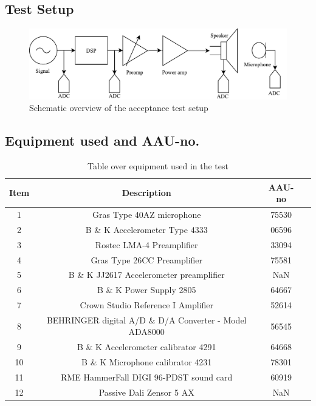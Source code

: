 \subsection*{Test Setup}

\begin{figure}[H]
	\centering
	\includegraphics[width=1\textwidth]{figures/TestAcceptance}
	\caption{Schematic overview of the acceptance test setup}
	\label{fig:Acceptancetest}
\end{figure}


\subsection*{Equipment used and AAU-no.}

\begin{table}[H]
\centering
{}
\begin{tabular}{S[table-format=1]ccc} \toprule
    {Item} & {Description} & {AAU-no} \\       &  Gras Type 40AZ microphone  & 75530   \\ 
    2      &  B \& K Accelerometer Type 4333  & 06596   \\ 
    3      &  Rostec LMA-4 Preamplifier  & 33094   \\
    4      &  Gras Type 26CC Preamplifier  & 75581   \\
    5      &  B \& K JJ2617 Accelerometer preamplifier & NaN   \\
    6      &  B \& K Power Supply 2805  & 64667  \\
    7      &  Crown Studio Reference I Amplifier & 52614   \\
    8      &  BEHRINGER digital A/D \& D/A Converter - Model ADA8000   & 56545   \\
    9      &  B \& K Accelerometer calibrator 4291 & 64668   \\
    10     &  B \& K Microphone calibrator 4231 & 78301   \\
    11     &  RME HammerFall DIGI 96-PDST sound card & 60919  \\
    12     &  Passive Dali Zensor 5 AX & NaN  \\ \bottomrule 
\end{tabular}
\caption{Table over equipment used in the test}
\label{tab:UsedEquipmentAcceptance}
\end{table}
\vspace{-5mm}


